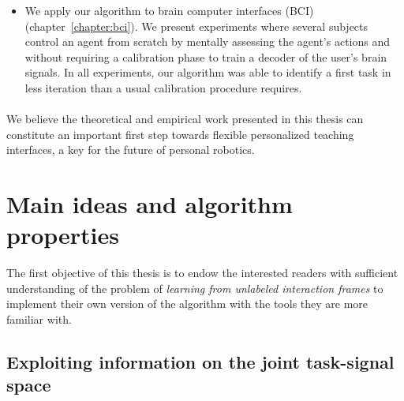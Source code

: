 \begin{itemize}
\item We apply our algorithm to brain computer interfaces (BCI) \cite{grizou2013zero,grizou2014calibration} (chapter~\ref{chapter:bci}). We present experiments where several subjects control an agent from scratch by mentally assessing the agent's actions and without requiring a calibration phase to train a decoder of the user's brain signals. In all experiments, our algorithm was able to identify a first task in less iteration than a usual calibration procedure requires.

\end{itemize}

\paragraph{} We believe the theoretical and empirical work presented in this thesis can constitute an important first step towards flexible personalized teaching interfaces, a key for the future of personal robotics.


\section{Main ideas and algorithm properties}

The first objective of this thesis is to endow the interested readers with sufficient understanding of the problem of \emph{learning from unlabeled interaction frames} to implement their own version of the algorithm with the tools they are more familiar with.


\subsection{Exploiting information on the joint task-signal space}

